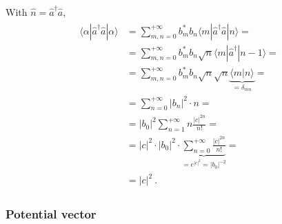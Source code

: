 \documentclass[letterpaper,10pt,english]{jupyterBook}
\begin{document}
\sphinxAtStartPar
With \(\hat{n} = \hat{a}^\dagger \hat{a}\),
\begin{equation*}
\begin{split}\begin{aligned}
  \langle \alpha | \hat{a}^\dagger \hat{a} | \alpha \rangle 
  & = \sum_{m,n=0}^{+\infty} b_m^* b_n \langle m | \hat{a}^\dagger \hat{a} | n \rangle = \\
  & = \sum_{m,n=0}^{+\infty} b_m^* b_n \sqrt{n} \langle m | \hat{a}^\dagger | n - 1 \rangle = \\
  & = \sum_{m,n=0}^{+\infty} b_m^* b_n \sqrt{n} \sqrt{n} \underbrace{\langle m | n \rangle}_{=\delta_{mn}} = \\
  & = \sum_{n=0}^{+\infty} | b_n |^2 \cdot n = \\
  & = |b_0|^2 \sum_{n=1}^{+\infty} n \frac{|c|^{2n}}{n!} = \\
  & = |c|^2 \cdot |b_0|^2 \cdot \underbrace{\sum_{n=0}^{+\infty} \frac{|c|^{2n}}{n!}}_{ = e^{|c|^2} = |b_0|^{-2}} = \\
  & = |c|^2 \ .
\end{aligned}\end{split}
\end{equation*}\subsubsection*{Potential vector}
\end{document}
